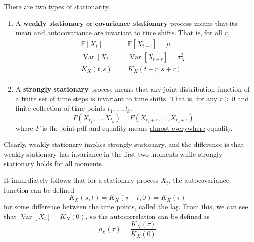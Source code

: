 \documentclass{article}
\DeclareMathOperator{\Var}{Var}
\begin{document}
  \begin{definition}[Stationarity]
    \label{def:stationarity}
    There are two types of stationarity. 
    \begin{enumerate}
      \item A \textbf{weakly stationary} or \textbf{covariance stationary} process means that its mean and autocovariance are invariant to time shifts. That is, for all $r$, 
        \begin{align}
          \mathbb{E}[X_t] & = \mathbb{E}[X_{t+r}] = \mu \\
          \Var[X_t] & = \Var[X_{t+r}] = \sigma_X^2 \\
          K_X (t, s) & = K_X (t + r, s + r) \\
        \end{align}

      \item A \textbf{strongly stationary} process means that any joint distribution function of a \hyperref[st-def:finite-set]{finite set} of time steps is invariant to time shifts. That is, for any $r > 0$ and  finite collection of time points $t_1, \ldots, t_k$, 
        \begin{equation}
          F(X_{t_1}, \ldots, X_{t_k}) = F(X_{t_1 + r}, \ldots, X_{t_k + r})
        \end{equation}
        where $F$ is the joint pdf and equality means \hyperref[mt-def:almost_everywhere]{almost everywhere} equality. 
    \end{enumerate}
    Clearly, weakly stationary implies strongly stationary, and the difference is that weakly stationary has invariance in the first two moments while strongly stationary holds for all moments. 
  \end{definition}

  \begin{theorem}
    \label{thm:autocovariance-of-a-stationary-process}
    It immediately follows that for a stationary process $X_t$, the autocovariance function can be defined 
    \begin{equation}
      K_X (s, t) = K_X(s - t, 0) = K_X (\tau)
    \end{equation}
    for some difference between the time points, called the lag. From this, we can see that $\Var[X_t] = K_X (0)$, so the autocorrelation can be defined as 
    \begin{equation}
      \rho_X(\tau) = \frac{K_X (\tau)}{K_X (0)}
    \end{equation}
  \end{theorem}
\end{document}
